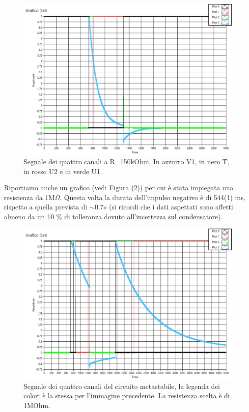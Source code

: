 \documentclass[journal, a4paper]{IEEEtran}
\begin{document}
\begin{figure}
\centering
\includegraphics[width=0.7\linewidth]{./es6_150k}
\caption{Segnale dei quattro canali a R=150kOhm. In azzurro V1, in nero T, in rosso U2 e in verde U1.}
\label{fig:es6_150k}
\end{figure}

Riportiamo anche un grafico (vedi Figura (\ref{fig:es6_1MO_double})) per cui è stata impiegata una resistenza da 1M$\Omega$. Questa volta la durata dell'impulso negativo è di 544(1) ms, rispetto a quella prevista di $\sim 0.7 s$ (si ricordi che i dati aspettati sono affetti \underline{almeno} da un 10 \% di tolleranza dovuto all'incertezza sul condensatore).\\

\begin{figure}
\centering
\includegraphics[width=0.7\linewidth]{./es6_1MO_double}
\caption{Segnale dei quattro canali del circuito metastabile, la legenda dei colori è la stessa per l'immagine precedente. La resistenza scelta è di 1MOhm.}
\label{fig:es6_1MO_double}
\end{figure}
\end{document}
